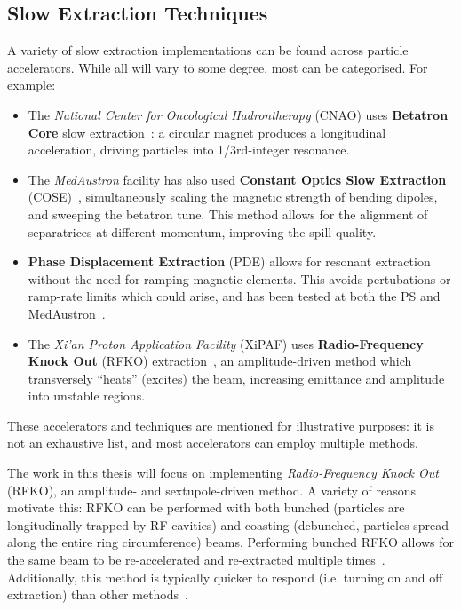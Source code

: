 \documentclass[11pt]{report}
\begin{document}
\subsection{Slow Extraction Techniques}\label{sec:rfko}


A variety of slow extraction implementations can be found across particle accelerators. While all will vary to some degree, most can be categorised. For example:
\begin{itemize}
  \item The \textit{National Center for Oncological Hadrontherapy} (CNAO) uses \textbf{Betatron Core} slow extraction~\cite{Falbo:IPAC2018-TUZGBF3}: a circular magnet produces a longitudinal acceleration, driving particles into 1/3rd-integer resonance.
  \item The \textit{MedAustron} facility has also used \textbf{Constant Optics Slow Extraction} (COSE)~\cite{ArrutiaSota:2845862}, simultaneously scaling the magnetic strength of bending dipoles, and sweeping the betatron tune. This method allows for the alignment of separatrices at different momentum, improving the spill quality.
  \item \textbf{Phase Displacement Extraction} (PDE) allows for resonant extraction without the need for ramping magnetic elements. This avoids pertubations or ramp-rate limits which could arise, and has been tested at both the PS and MedAustron~\cite{Maksimov:1996xb, ARRUTIASOTA2022167007}.
  \item The \textit{Xi’an Proton Application Facility} (XiPAF) uses \textbf{Radio-Frequency Knock Out} (RFKO) extraction~\cite{Yao:2016cnf}, an amplitude-driven method which transversely ``heats'' (excites) the beam, increasing emittance and amplitude into unstable regions.
\end{itemize}
These accelerators and techniques are mentioned for illustrative purposes: it is not an exhaustive list, and most accelerators can employ multiple methods.
 
The work in this thesis will focus on implementing \textit{Radio-Frequency Knock Out} (RFKO), an amplitude- and sextupole-driven method. A variety of reasons motivate this: RFKO can be performed with both bunched (particles are longitudinally trapped by RF cavities) and coasting (debunched, particles spread along the entire ring circumference) beams. Performing bunched RFKO allows for the same beam to be re-accelerated and re-extracted multiple times~\cite{russo}. Additionally, this method is typically quicker to respond (i.e. turning on and off extraction) than other methods~\cite{Furukawa2002PROGRESSOR, FURUKAWA200259, NODA2002241}.
\end{document}
